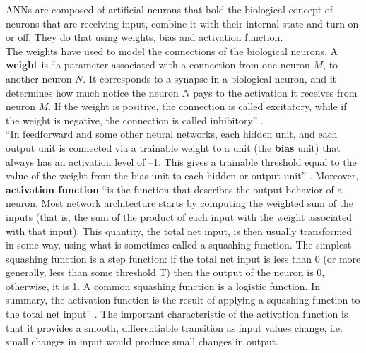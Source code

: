 ANNs are composed of artificial neurons that hold the biological concept of neurons that are receiving input, combine it with their internal state and turn on or off. They do that using weights, bias and activation function.\\
The weights have used to model the connections of the biological neurons. A \textbf{weight} is ``a parameter associated with a connection from one neuron $M$, to another neuron $N$. It corresponds to a synapse in a biological neuron, and it determines how much notice the neuron $N$ pays to the activation it receives from neuron $M$. If the weight is positive, the connection is called excitatory, while if the weight is negative, the connection is called inhibitory'' \cite{MLDict}.\\
``In feedforward and some other neural networks, each hidden unit, and each output unit is connected via a trainable weight to a unit (the \textbf{bias} unit) that always has an activation level of –1. This gives a trainable threshold equal to the value of the weight from the bias unit to each hidden or output unit'' \cite{MLDict}.
Moreover, \textbf{activation function} ``is the function that describes the output behavior of a neuron. Most network architecture starts by computing the weighted sum of the inputs (that is, the sum of the product of each input with the weight associated with that input). This quantity, the total net input, is then usually transformed in some way, using what is sometimes called a squashing function. The simplest squashing function is a step function: if the total net input is less than 0 (or more generally, less than some threshold T) then the output of the neuron is 0, otherwise, it is 1. A common squashing function is a logistic function. In summary, the activation function is the result of applying a squashing function to the total net input'' \cite{MLDict}. The important characteristic of the activation function is that it provides a smooth, differentiable transition as input values change, i.e. small changes in input would produce small changes in output.

